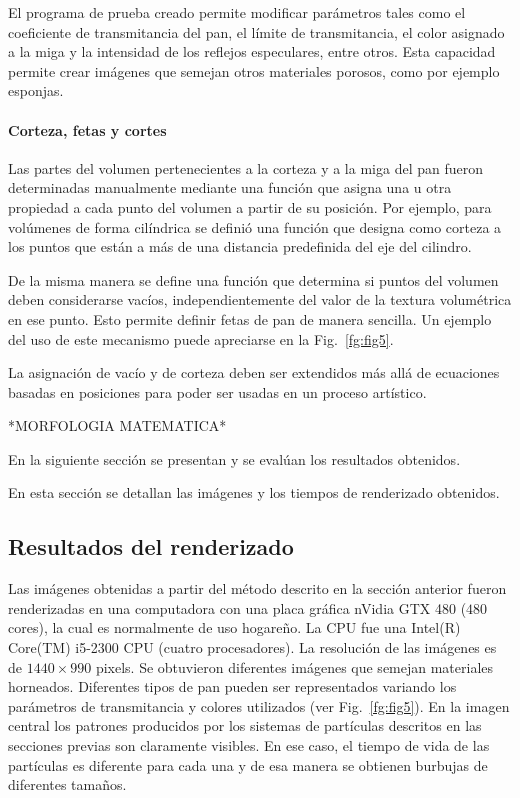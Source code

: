 El programa de prueba creado permite modificar parámetros tales como el coeficiente de transmitancia del pan, el límite de transmitancia, el color asignado a la miga y la intensidad de los reflejos especulares, entre otros. Esta capacidad permite crear imágenes que semejan otros
materiales porosos, como por ejemplo esponjas.

\paragraph{Corteza, fetas y cortes}

Las partes del volumen pertenecientes a la corteza y a la miga del pan fueron determinadas manualmente mediante una función que asigna una u otra propiedad a cada punto del volumen a partir de su posición. Por ejemplo, para volúmenes de forma cilíndrica se definió una función que designa como corteza a los puntos que están a más de una distancia predefinida del eje del cilindro.

De la misma manera se define una función que determina si puntos del volumen deben considerarse vacíos, independientemente del valor de la textura volumétrica en ese punto. Esto permite definir fetas de pan de manera sencilla. Un ejemplo del uso de este mecanismo puede apreciarse
en la Fig.~\ref{fg:fig5}.

La asignación de vacío y de corteza deben ser extendidos más allá de ecuaciones basadas en posiciones para poder ser usadas en un proceso artístico.

*MORFOLOGIA MATEMATICA*


En la siguiente sección se presentan y se evalúan los resultados obtenidos.

En esta sección se detallan las imágenes y los tiempos de renderizado obtenidos. 

\subsection{Resultados del renderizado}

Las imágenes obtenidas a partir del método descrito en la sección anterior fueron renderizadas en una computadora con una placa gráfica nVidia GTX 480 ($480$ cores), la cual es normalmente de uso hogareño. La CPU fue una Intel(R) Core(TM) i5-2300 CPU (cuatro procesadores). La resolución de las imágenes es de $1440\times990$ pixels. 
Se obtuvieron diferentes imágenes que semejan materiales horneados. Diferentes tipos de pan pueden ser representados variando los parámetros de transmitancia y colores utilizados (ver Fig.~\ref{fg:fig5}). En la imagen central los patrones producidos por los sistemas de partículas descritos en las secciones previas son claramente visibles. En ese caso, el tiempo de vida de las partículas es diferente para cada una y de esa manera se obtienen burbujas de
diferentes tamaños.

